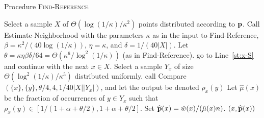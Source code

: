 \begin{algorithm}[ht!]
\label{alg:find-ref}
\caption{Procedure \textsc{Find-Reference}}
  \begin{algorithmic}[1]
  \Require{\PCOND and \SAMP query access to a distribution $\D$ and a parameter $\kappa \in (0,1/4]$}
  \State Select a sample $X$ of   $\Theta(\log(1/\kappa)/\kappa^2)$ points distributed according to $\D$.
      \State Call  {\sc Estimate-Neighborhood}  with the parameters $\kappa$ as in the input to {\sc Find-Reference}, $\beta = \kappa^2/(40\log(1/\kappa))$,
   $ \eta = \kappa$, and $\delta = 1/(40|X|)$. 
      \State Let $\theta = \kappa\eta\beta\delta/64 = \Theta(\kappa^6/\log^2(1/\kappa))$ (as in {\sc Find-Reference}).
        go to Line~\ref{st:x-S}  and continue with the next $x \in X$.
      \EndIf
      \State Select a sample $Y_x$ of size $\Theta(\log^2(1/\kappa)/\kappa^5)$
    distributed uniformly.
        \State call {\sc Compare}$(\{x\},\{y\},\theta/4,4,1/40|X||Y_x|)$,
         and let the output be denoted $\rho_x(y)$
      \EndFor
      \State Let $\hat{\mu}(x)$ be the fraction of occurrences of
  $y \in Y_x$ such that $\rho_x(y) \in [1/(1+\alpha+\theta/2),1+\alpha+\theta/2]$.
      \State Set $\widehat{\mathbf{p}}(x) = \hat{w}(x)/(\hat{\mu}(x) n)$.
  \EndFor
    \State \Return $(x,\widehat{\mathbf{p}}(x))$
  \Else 
    \State {}
  \EndIf
  \end{algorithmic}
\end{algorithm}



